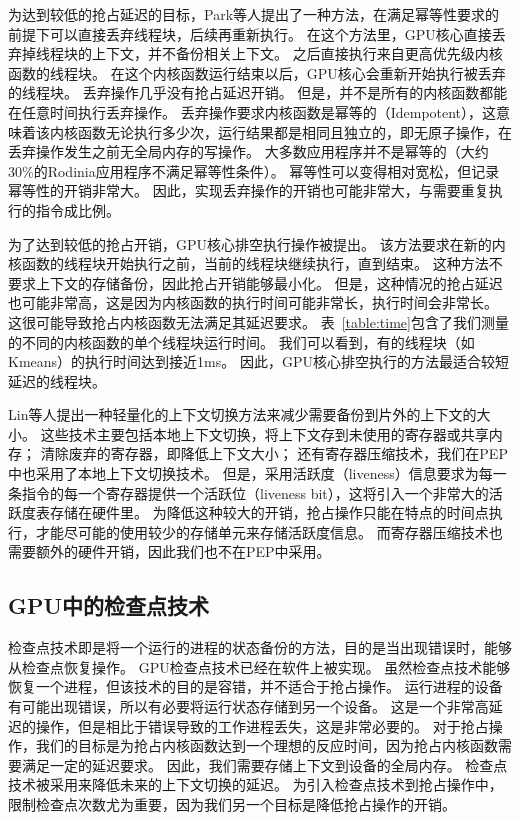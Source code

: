 为达到较低的抢占延迟的目标，Park等人提出了一种方法，在满足幂等性要求的前提下可以直接丢弃线程块，后续再重新执行。
在这个方法里，GPU核心直接丢弃掉线程块的上下文，并不备份相关上下文。
之后直接执行来自更高优先级内核函数的线程块。
在这个内核函数运行结束以后，GPU核心会重新开始执行被丢弃的线程块。
丢弃操作几乎没有抢占延迟开销。
但是，并不是所有的内核函数都能在任意时间执行丢弃操作。
丢弃操作要求内核函数是幂等的（Idempotent），这意味着该内核函数无论执行多少次，运行结果都是相同且独立的，即无原子操作，在丢弃操作发生之前无全局内存的写操作。
大多数应用程序并不是幂等的（大约30\%的Rodinia应用程序不满足幂等性条件）。
幂等性可以变得相对宽松，但记录幂等性的开销非常大。
因此，实现丢弃操作的开销也可能非常大，与需要重复执行的指令成比例。

为了达到较低的抢占开销，GPU核心排空执行操作被提出。
该方法要求在新的内核函数的线程块开始执行之前，当前的线程块继续执行，直到结束。
这种方法不要求上下文的存储备份，因此抢占开销能够最小化。
但是，这种情况的抢占延迟也可能非常高，这是因为内核函数的执行时间可能非常长，执行时间会非常长。
这很可能导致抢占内核函数无法满足其延迟要求。
表~\ref{table:time}包含了我们测量的不同的内核函数的单个线程块运行时间。
我们可以看到，有的线程块（如Kmeans）的执行时间达到接近1ms。
因此，GPU核心排空执行的方法最适合较短延迟的线程块。

Lin等人提出一种轻量化的上下文切换方法来减少需要备份到片外的上下文的大小。
这些技术主要包括本地上下文切换，将上下文存到未使用的寄存器或共享内存；
清除废弃的寄存器，即降低上下文大小；
还有寄存器压缩技术，我们在PEP中也采用了本地上下文切换技术。
但是，采用活跃度（liveness）信息要求为每一条指令的每一个寄存器提供一个活跃位（liveness bit），这将引入一个非常大的活跃度表存储在硬件里。
为降低这种较大的开销，抢占操作只能在特点的时间点执行，才能尽可能的使用较少的存储单元来存储活跃度信息。
而寄存器压缩技术也需要额外的硬件开销，因此我们也不在PEP中采用。

\subsection{GPU中的检查点技术}
检查点技术即是将一个运行的进程的状态备份的方法，目的是当出现错误时，能够从检查点恢复操作。
GPU检查点技术已经在软件上被实现。
虽然检查点技术能够恢复一个进程，但该技术的目的是容错，并不适合于抢占操作。
运行进程的设备有可能出现错误，所以有必要将运行状态存储到另一个设备。
这是一个非常高延迟的操作，但是相比于错误导致的工作进程丢失，这是非常必要的。
对于抢占操作，我们的目标是为抢占内核函数达到一个理想的反应时间，因为抢占内核函数需要满足一定的延迟要求。
因此，我们需要存储上下文到设备的全局内存。
检查点技术被采用来降低未来的上下文切换的延迟。
为引入检查点技术到抢占操作中，限制检查点次数尤为重要，因为我们另一个目标是降低抢占操作的开销。

